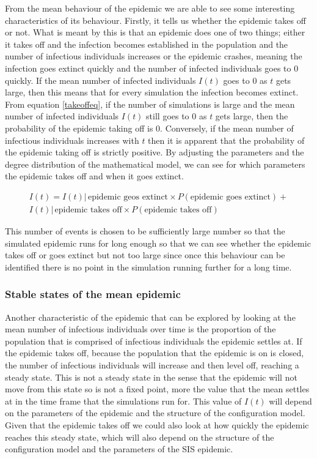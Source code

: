 \documentclass{uonmathsreport}
\begin{document}
From the mean behaviour of the epidemic we are able to see some interesting characteristics of its behaviour. Firstly, it tells us whether the epidemic takes off or not. What is meant by this is that an epidemic does one of two things; either it takes off and the infection becomes established in the population and the number of infectious individuals increases or the epidemic crashes, meaning the infection goes extinct quickly and the number of infected individuals goes to $0$ quickly. If the mean number of infected individuals $I(t)$ goes to $0$ as $t$ gets large, then this means that for every simulation the infection becomes extinct. From equation \eqref{takeoffeq}, if the number of simulations is large and the mean number of infected individuals $I(t)$ still goes to $0$ as $t$ gets large, then the probability of the epidemic taking off is $0$. Conversely, if the mean number of infectious individuals increases with $t$ then it is apparent that the probability of the epidemic taking off is strictly positive. By adjusting the parameters and the degree distribution of the mathematical model, we can see for which parameters the epidemic takes off and when it goes extinct.

\begin{equation} \label{takeoffeq}
\begin{split}
I(t)=I(t)\vert\, \mbox{epidemic geos extinct} \times P(\mbox{epidemic goes extinct}) +\\
I(t)\vert\, \mbox{epidemic takes off} \times P(\mbox{epidemic takes off})
\end{split}
\end{equation}

This number of events is chosen to be sufficiently large number so that the simulated epidemic runs for long enough so that we can see whether the epidemic takes off or goes extinct but not too large since once this behaviour can be identified there is no point in the simulation running further for a long time.

\subsubsection{Stable states of the mean epidemic} \label{subsub:5.4.2}

Another characteristic of the epidemic that can be explored by looking at the mean number of infectious individuals over time is the proportion of the population that is comprised of infectious individuals the epidemic settles at. If the epidemic takes off, because the population that the epidemic is on is closed, the number of infectious individuals will increase and then level off, reaching a steady state. This is not a steady state in the sense that the epidemic will not move from this state so is not a fixed point, more the value that the mean settles at in the time frame that the simulations run for. This value of $I(t)$ will depend on the parameters of the epidemic and the structure of the configuration model. Given that the epidemic takes off we could also look at how quickly the epidemic reaches this steady state, which will also depend on the structure of the configuration model and the parameters of the SIS epidemic.
\end{document}
